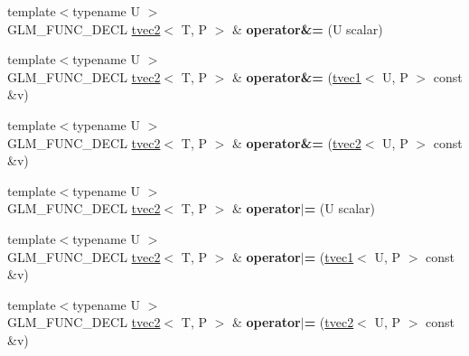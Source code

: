 \begin{DoxyCompactItemize}
\item 
\hypertarget{structglm_1_1tvec2_a5373920ff477eeccfa2307c9097af978}{{\footnotesize template$<$typename U $>$ }\\G\-L\-M\-\_\-\-F\-U\-N\-C\-\_\-\-D\-E\-C\-L \hyperlink{structglm_1_1tvec2}{tvec2}$<$ T, P $>$ \& {\bfseries operator\&=} (U scalar)}\label{structglm_1_1tvec2_a5373920ff477eeccfa2307c9097af978}

\item 
\hypertarget{structglm_1_1tvec2_acd64e45f039ba3b658d5a46d99fff26a}{{\footnotesize template$<$typename U $>$ }\\G\-L\-M\-\_\-\-F\-U\-N\-C\-\_\-\-D\-E\-C\-L \hyperlink{structglm_1_1tvec2}{tvec2}$<$ T, P $>$ \& {\bfseries operator\&=} (\hyperlink{structglm_1_1tvec1}{tvec1}$<$ U, P $>$ const \&v)}\label{structglm_1_1tvec2_acd64e45f039ba3b658d5a46d99fff26a}

\item 
\hypertarget{structglm_1_1tvec2_a672a9a33f367f753d0fc12116bff65bf}{{\footnotesize template$<$typename U $>$ }\\G\-L\-M\-\_\-\-F\-U\-N\-C\-\_\-\-D\-E\-C\-L \hyperlink{structglm_1_1tvec2}{tvec2}$<$ T, P $>$ \& {\bfseries operator\&=} (\hyperlink{structglm_1_1tvec2}{tvec2}$<$ U, P $>$ const \&v)}\label{structglm_1_1tvec2_a672a9a33f367f753d0fc12116bff65bf}

\item 
\hypertarget{structglm_1_1tvec2_a4992709adc592f1790beedc60d2089cd}{{\footnotesize template$<$typename U $>$ }\\G\-L\-M\-\_\-\-F\-U\-N\-C\-\_\-\-D\-E\-C\-L \hyperlink{structglm_1_1tvec2}{tvec2}$<$ T, P $>$ \& {\bfseries operator$\vert$=} (U scalar)}\label{structglm_1_1tvec2_a4992709adc592f1790beedc60d2089cd}

\item 
\hypertarget{structglm_1_1tvec2_a4cb8e942400c0ea18beb292a50c49958}{{\footnotesize template$<$typename U $>$ }\\G\-L\-M\-\_\-\-F\-U\-N\-C\-\_\-\-D\-E\-C\-L \hyperlink{structglm_1_1tvec2}{tvec2}$<$ T, P $>$ \& {\bfseries operator$\vert$=} (\hyperlink{structglm_1_1tvec1}{tvec1}$<$ U, P $>$ const \&v)}\label{structglm_1_1tvec2_a4cb8e942400c0ea18beb292a50c49958}

\item 
\hypertarget{structglm_1_1tvec2_a2bb8b0876df3f551acf4dae3134e0d2e}{{\footnotesize template$<$typename U $>$ }\\G\-L\-M\-\_\-\-F\-U\-N\-C\-\_\-\-D\-E\-C\-L \hyperlink{structglm_1_1tvec2}{tvec2}$<$ T, P $>$ \& {\bfseries operator$\vert$=} (\hyperlink{structglm_1_1tvec2}{tvec2}$<$ U, P $>$ const \&v)}\label{structglm_1_1tvec2_a2bb8b0876df3f551acf4dae3134e0d2e}


\end{DoxyCompactItemize}
